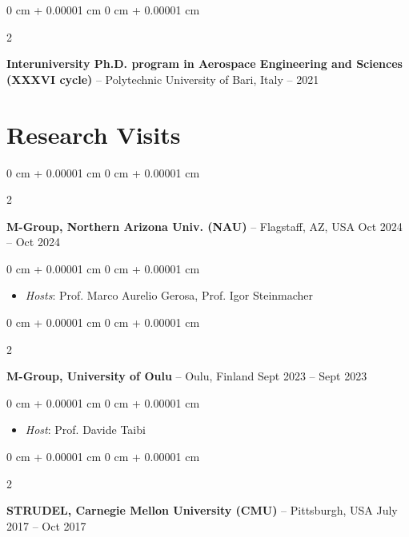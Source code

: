 \documentclass[10pt, a4paper]{article}
\newenvironment{highlights}{
    \begin{itemize}[
        topsep=0.10 cm,
        parsep=0.10 cm,
        partopsep=0pt,
        itemsep=0pt,
        leftmargin=0 cm + 10pt
    ]
}{
    \end{itemize}
} %
\newenvironment{onecolentry}{
    \begin{adjustwidth}{
        0 cm + 0.00001 cm
    }{
        0 cm + 0.00001 cm
    }
}{
    \end{adjustwidth}
} %
\newenvironment{twocolentry}[2][]{
    \onecolentry
    \def\secondColumn{#2}
    \setcolumnwidth{\fill, 4.5 cm}
    \begin{paracol}{2}
}{
    \switchcolumn \raggedleft \secondColumn
    \end{paracol}
    \endonecolentry
} %
\begin{document}
        \vspace{0.2 cm}

        \begin{twocolentry}{
            2020 – 2021
        }
            \textbf{Interuniversity Ph.D. program in Aerospace Engineering and Sciences (XXXVI cycle)} -- Polytechnic University of Bari, Italy\end{twocolentry}




    
    \section{Research Visits}



        
        \begin{twocolentry}{
            Oct 2024 – Oct 2024
        }
            \textbf{M-Group, Northern Arizona Univ. (NAU)} -- Flagstaff, AZ, USA\end{twocolentry}

        \vspace{0.10 cm}
        \begin{onecolentry}
            \begin{highlights}
                \item \textit{Hosts}: Prof. Marco Aurelio Gerosa, Prof. Igor Steinmacher
            \end{highlights}
        \end{onecolentry}


        \vspace{0.2 cm}

        \begin{twocolentry}{
            Sept 2023 – Sept 2023
        }
            \textbf{M-Group, University of Oulu} -- Oulu, Finland\end{twocolentry}

        \vspace{0.10 cm}
        \begin{onecolentry}
            \begin{highlights}
                \item \textit{Host}: Prof. Davide Taibi
            \end{highlights}
        \end{onecolentry}


        \vspace{0.2 cm}

        \begin{twocolentry}{
            July 2017 – Oct 2017
        }
            \textbf{STRUDEL, Carnegie Mellon University (CMU)} -- Pittsburgh, USA\end{twocolentry}
\end{document}
